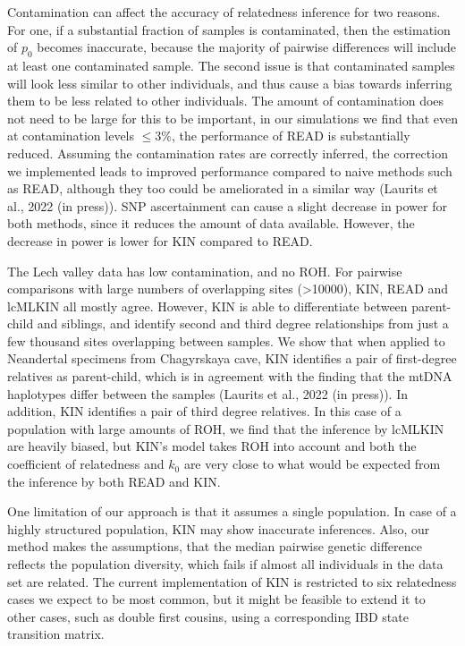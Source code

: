 \documentclass[12pt, letterpaper]{article}
\begin{document}
Contamination can affect the accuracy of relatedness inference for two reasons. For one, if a substantial fraction of samples is contaminated, then the estimation of $p_0$ becomes inaccurate, because the majority of pairwise differences will include at least one contaminated sample. The second issue is that contaminated samples will look less similar to other individuals, and thus cause a bias towards inferring them to be less related to other individuals. The amount of contamination does not need to be large for this to be important, in our simulations we find that even at contamination levels $\leq 3\%$, the performance of READ is substantially reduced.  Assuming the contamination rates are correctly inferred, the correction we implemented leads to improved performance compared to naive methods such as READ, although they too could be ameliorated in a similar way (Laurits et al., 2022 (in press)). SNP ascertainment can cause a slight decrease in power for both  methods, since it reduces the amount of data available. However, the decrease in power is lower for KIN compared to READ.

The Lech valley data  has low contamination, and no ROH. For pairwise comparisons with large numbers of overlapping sites (>10000), KIN, READ and lcMLKIN all mostly agree. However, KIN is able to differentiate between parent-child and siblings, and identify second and third degree relationships from just a few thousand sites overlapping between samples. We show that when applied to Neandertal specimens from Chagyrskaya cave, KIN identifies a pair of first-degree relatives as parent-child, which is in agreement with the finding that the mtDNA haplotypes differ between the samples (Laurits et al., 2022 (in press)). In addition, KIN identifies a pair of third degree relatives. In this case of a population with large amounts of ROH, we find that the inference by lcMLKIN are heavily biased, but KIN's model takes ROH into account and both the coefficient of relatedness and $k_0$ are very close to what would be expected from the inference by both READ and KIN. 

One limitation of our approach is that it assumes a single population. In case of a highly structured population, KIN may show inaccurate inferences. Also, our method makes the assumptions, that the median pairwise genetic difference reflects the population diversity, which fails if almost all individuals in the data set are related. The current implementation of KIN is restricted to six relatedness cases we expect to be most common, but it might be feasible to extend it to other cases, such as double first cousins, using a corresponding IBD state transition matrix.
\end{document}
